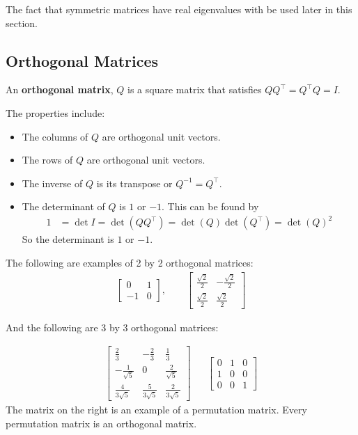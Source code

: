The fact that symmetric matrices have real eigenvalues with be used later in this section.  


\subsection{Orthogonal Matrices}

An \textbf{orthogonal matrix}, $Q$ is a square matrix that satisfies $QQ^{\intercal} =Q^{\intercal}Q=I$.  

The properties include:
\begin{itemize}
\item The columns of $Q$ are orthogonal unit vectors. 
\item The rows of $Q$ are orthogonal unit vectors. 
\item The inverse of $Q$ is its transpose or $Q^{-1} = Q^{\intercal}$.  
\item The determinant of $Q$ is $1$ or $-1$.  This can be found by 
\begin{align*}
1 & = \det I = \det (QQ^{\intercal}) = \det(Q) \det(Q^{\intercal})  = \det(Q)^2
\end{align*}
So the determinant is $1$ or $-1$. 
\end{itemize}

\vspace{1in}

\begin{example}
The following are examples of 2 by 2 orthogonal matrices: 
\begin{align*}
\begin{bmatrix}
0 & 1 \\
-1 & 0 
\end{bmatrix}, \qquad \begin{bmatrix}
\frac{\sqrt{2}}{2} & -\frac{\sqrt{2}}{2} \\[6pt]
\frac{\sqrt{2}}{2} & \frac{\sqrt{2}}{2}
\end{bmatrix}
\end{align*}

And the following are 3 by 3 orthogonal matrices:

\begin{align*}
\begin{bmatrix}
\frac{2}{3} & -\frac{2}{3} & \frac{1}{3}\\[4pt]
-\frac{1}{\sqrt{5}} & 0 & \frac{2}{\sqrt{5}} \\[4pt]
\frac{4}{3\sqrt{5}} & \frac{5}{3\sqrt{5}} & \frac{2}{3\sqrt{5}}
\end{bmatrix} &&
\begin{bmatrix}
0 & 1 & 0 \\
1 & 0 & 0 \\
0 & 0 & 1 
\end{bmatrix}
\end{align*}
The matrix on the right is an example of a permutation matrix.  Every permutation matrix is an orthogonal matrix.  
\end{example}




